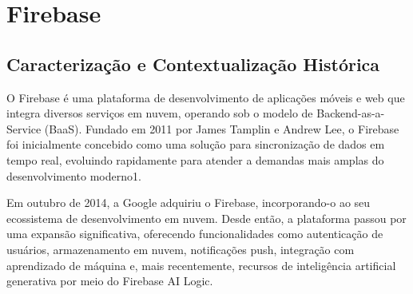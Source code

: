 \section{Firebase}
\subsection{Caracterização e Contextualização Histórica}

O Firebase é uma plataforma de desenvolvimento de aplicações móveis e web que integra diversos serviços em nuvem, operando sob o modelo de Backend-as-a-Service (BaaS). Fundado em 2011 por James Tamplin e Andrew Lee, o Firebase foi inicialmente concebido como uma solução para sincronização de dados em tempo real, evoluindo rapidamente para atender a demandas mais amplas do desenvolvimento moderno1\cite{firebase2025cloudnext}.

Em outubro de 2014, a Google adquiriu o Firebase, incorporando-o ao seu ecossistema de desenvolvimento em nuvem. Desde então, a plataforma passou por uma expansão significativa, oferecendo funcionalidades como autenticação de usuários, armazenamento em nuvem, notificações push, integração com aprendizado de máquina e, mais recentemente, recursos de inteligência artificial generativa por meio do Firebase AI Logic.
\begin{comment}
	O Firebase constitui-se como uma plataforma abrangente de desenvolvimento para aplicações móveis e web, tendo sido incorporada ao portfólio de soluções da Google Inc. em outubro de 2014 através de processo de aquisição estratégica \cite{google2014firebase}. Originalmente fundada em 2011 por James Tamplin e Andrew Lee, a plataforma Firebase foi concebida com o propósito de fornecer uma infraestrutura de backend-as-a-service (BaaS) completa e de alta usabilidade, direcionada especificamente para simplificar o processo de desenvolvimento e implementação de aplicações digitais \cite{tamplin2021firebase}.
	
	A filosofia de desenvolvimento da plataforma fundamenta-se na disponibilização de um ecossistema integrado de serviços diversos, que abrangem desde funcionalidades básicas de armazenamento de dados até recursos avançados de análise comportamental e engajamento de usuários \cite{firebase2023docs}. Esta abordagem holística visa reduzir a complexidade técnica tradicionalmente associada ao desenvolvimento de backends customizados, permitindo que desenvolvedores concentrem seus esforços na criação de interfaces e experiências de usuário diferenciadas.
\end{comment}


